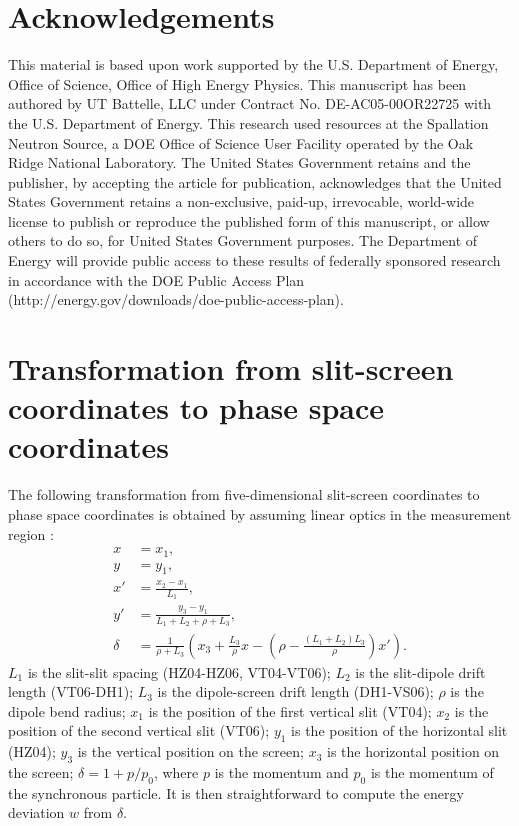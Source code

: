 \documentclass[%
 reprint,
 amsmath,amssymb,
 aps,
prstab,
]{revtex4-2}
\begin{document}
\section{Acknowledgements}
This material is based upon work supported by the U.S. Department of Energy, Office of Science, Office of High Energy Physics. This manuscript has been authored by UT Battelle, LLC under Contract No. DE-AC05-00OR22725 with the U.S. Department of Energy. This research used resources at the Spallation Neutron Source, a DOE Office of Science User Facility operated by the Oak Ridge National Laboratory. The United States Government retains and the publisher, by accepting the article for publication, acknowledges that the United States Government retains a non-exclusive, paid-up, irrevocable, world-wide license to publish or reproduce the published form of this manuscript, or allow others to do so, for United States Government purposes. The Department of Energy will provide public access to these results of federally sponsored research in accordance with the DOE Public Access Plan (http://energy.gov/downloads/doe-public-access-plan).


\appendix

\section{Transformation from slit-screen coordinates to phase space coordinates}\label{app-transform}

The following transformation from five-dimensional slit-screen coordinates to phase space coordinates is obtained by assuming linear optics in the measurement region \cite{Cathey2018-thesis}:
%
\begin{equation}\label{eq:transform}
    \begin{aligned}
    x &= x_1, \\
    y &= y_1, \\
    x' &= \frac{x_2 - x_1}{L_1}, \\
    y' &= \frac{y_3 - y_1}{L_1 + L_2 + \rho + L_3}, \\
    \delta &= \frac{1}{\rho + L_3} 
    \left(
        x_3 + \frac{L_3}{\rho} x -
        \left({
            \rho - \frac{(L_1 + L_2) L_3}{\rho}
        }\right) x'
    \right).
    \end{aligned}
\end{equation}
%
$L_1$ is the slit-slit spacing (HZ04-HZ06, VT04-VT06); $L_2$ is the slit-dipole drift length (VT06-DH1); $L_3$ is the dipole-screen drift length (DH1-VS06); $\rho$ is the dipole bend radius; $x_1$ is the position of the first vertical slit (VT04); $x_2$ is the position of the second vertical slit (VT06); $y_1$ is the position of the horizontal slit (HZ04); $y_3$ is the vertical position on the screen; $x_3$ is the horizontal position on the screen; $\delta = 1 + p/p_0$, where $p$ is the momentum and $p_0$ is the momentum of the synchronous particle. It is then straightforward to compute the energy deviation $w$ from $\delta$.



\end{document}
